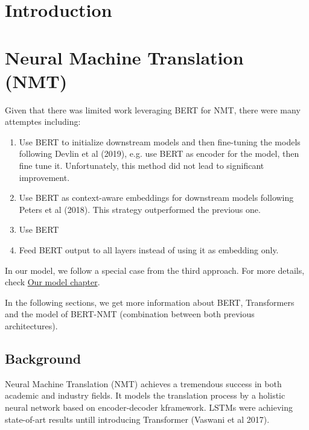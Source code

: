 \documentclass{report}
\begin{document}
\def\blankpage{%
      \clearpage%
      \thispagestyle{empty}%
      \addtocounter{page}{-1}%
      \null%
      \clearpage}


\tableofcontents




\chapter{Introduction}

\chapter{Neural Machine Translation (NMT)}
\label{ch:nmt}
Given that there was limited work leveraging BERT for NMT, there were many attemptes including:
\begin{enumerate}
	\item  Use BERT to initialize downstream models and then fine-tuning the models following Devlin et al (2019), e.g. use BERT as encoder for the model, then fine tune it. Unfortunately, this method did not lead to significant improvement.
	\item Use BERT as context-aware embeddings for downstream models following Peters et al (2018). This strategy outperformed the previous one.
	\item Use BERT \item Feed BERT output to all layers instead of using it as embedding only.
\end{enumerate}
In our model, we follow a special case from the third approach. For more details, check \hyperref[ch:our-model]{Our model chapter}.

In the following sections, we get more information about BERT, Transformers and the model of BERT-NMT (combination between both previous architectures).

\section{Background}
\label{sec:nmt-background}
Neural Machine Translation (NMT) achieves a tremendous success in both academic and industry fields. It models the translation process by a  holistic neural network based on encoder-decoder kframework. LSTMs were achieving state-of-art results untill introducing Transformer (Vaswani et al 2017).
\end{document}
